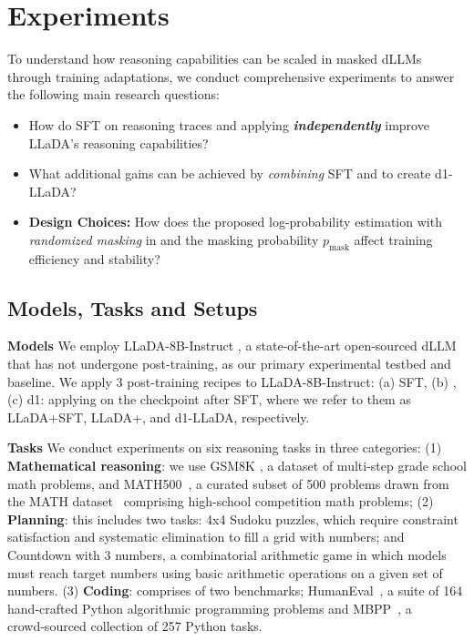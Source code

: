 \vspace{-2mm}
\section{Experiments}
\vspace{-2mm}
To understand how reasoning capabilities can be scaled in masked dLLMs through training adaptations, we conduct comprehensive experiments to answer the following main research questions:
\vspace{-1.5mm}
\begin{itemize}[leftmargin=15pt,topsep=0pt,itemsep=0.3pt,parsep=0pt]
    \item[(1)] How do SFT on reasoning traces and applying \grpo{} \textbf{\emph{independently}} improve LLaDA’s reasoning capabilities?
    \item[(2)] What additional gains can be achieved by \emph{combining} SFT and \grpo to create d1-LLaDA?
    \item[(3)] \textbf{Design Choices:} How does the proposed log-probability estimation with \emph{randomized masking} in \grpo{} and the masking probability $p_{\text{mask}}$ affect training efficiency and stability?
\end{itemize}


\subsection{Models, Tasks and Setups}
\textbf{Models} We employ LLaDA-8B-Instruct \citep{nie2025largelanguagediffusionmodels}, a state-of-the-art open-sourced dLLM that has not undergone post-training, as our primary experimental testbed and baseline. We apply 3 post-training recipes to LLaDA-8B-Instruct: (a) SFT, (b) \grpo, (c) d1: applying \grpo on the checkpoint after SFT, where we refer to them as LLaDA+SFT, LLaDA+\grpo, and d1-LLaDA, respectively. 

\textbf{Tasks} We conduct experiments on six reasoning tasks in three categories: (1) \textbf{Mathematical reasoning}: we use GSM8K \citep{cobbe2021training}, a dataset of multi-step grade school math problems, and MATH500~\citep{lightman2023lets}, a curated subset of 500 problems drawn from the MATH dataset~\citep{hendrycks2021measuring} comprising high-school competition math problems; (2) \textbf{Planning}: this includes two tasks: 4x4 Sudoku puzzles, which require constraint satisfaction and systematic elimination to fill a grid with numbers; and Countdown with 3 numbers, a combinatorial arithmetic game in which models must reach target numbers using basic arithmetic operations on a given set of numbers. (3) \textbf{Coding}: comprises of two benchmarks; HumanEval~\citep{chen2021evaluating}, a suite of 164 hand‑crafted Python algorithmic programming problems and MBPP~\citep{austin2021program}, a crowd‑sourced collection of 257 Python tasks.

